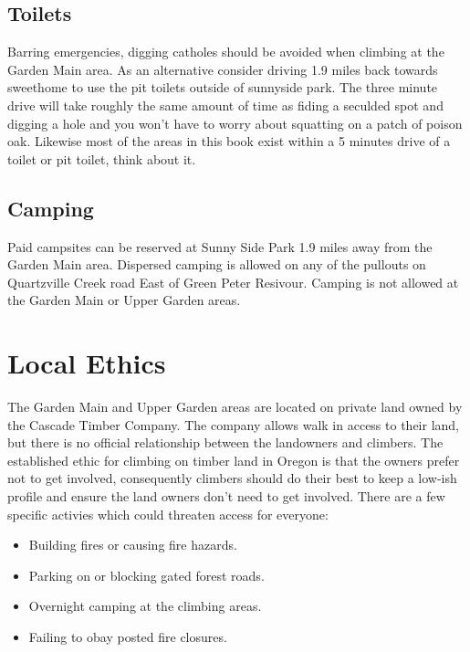 \subsection*{Toilets}
Barring emergencies, digging catholes should be avoided when climbing at the Garden Main area. As an alternative consider driving 1.9 miles back towards sweethome to use the pit toilets outside of sunnyside park. The three minute drive will take roughly the same amount of time as fiding a seculded spot and digging a hole and you won't have to worry about squatting on a patch of poison oak. Likewise most of the areas in this book exist within a 5 minutes drive of a toilet or pit toilet, think about it. 
\subsection*{Camping}
Paid campsites can be reserved at Sunny Side Park 1.9 miles away from the Garden Main area. Dispersed camping is allowed on any of the pullouts on Quartzville Creek road East of Green Peter Resivour. Camping is not allowed at the Garden Main or Upper Garden areas.
\section{Local Ethics}
The Garden Main and Upper Garden areas are located on private land owned by the Cascade Timber Company. The company allows walk in access to their land, but there is no official relationship between the landowners and climbers. The established ethic for climbing on timber land in Oregon is that the owners prefer not to get involved, consequently climbers should do their best to keep a low-ish profile and ensure the land owners don't need to get involved. There are a few specific activies which could threaten access for everyone:\\
\begin{itemize}
\item Building fires or causing fire hazards.\\
\item Parking on or blocking gated forest roads.\\
\item Overnight camping at the climbing areas.\\
\item Failing to obay posted fire closures.\\
\end{itemize}
